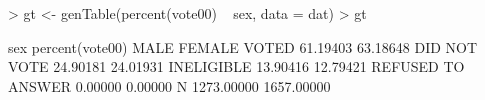\begin{Schunk}
\begin{Sinput}
> gt <- genTable(percent(vote00) ~ sex, data = dat)
> gt
\end{Sinput}
\begin{Soutput}
                   sex
percent(vote00)           MALE     FEMALE
  VOTED               61.19403   63.18648
  DID NOT VOTE        24.90181   24.01931
  INELIGIBLE          13.90416   12.79421
  REFUSED TO ANSWER    0.00000    0.00000
  N                 1273.00000 1657.00000
\end{Soutput}
\end{Schunk}
